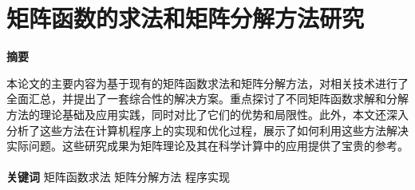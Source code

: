 \thispagestyle{empty}
\section*{矩阵函数的求法和矩阵分解方法研究}
\fontsize{12pt}{14pt}\selectfont
\songti
    \begin{center}
        \textbf{\large 摘要}
    \end{center}
    \par 本论文的主要内容为基于现有的矩阵函数求法和矩阵分解方法，对相关技术进行了全面汇总，并提出了一套综合性的解决方案。重点探讨了不同矩阵函数求解和分解方法的理论基础及应用实践，同时对比了它们的优势和局限性。此外，本文还深入分析了这些方法在计算机程序上的实现和优化过程，展示了如何利用这些方法解决实际问题。这些研究成果为矩阵理论及其在科学计算中的应用提供了宝贵的参考。
    \\
    \\
    \textbf{关键词} \quad 矩阵函数求法 \quad 矩阵分解方法 \quad 程序实现